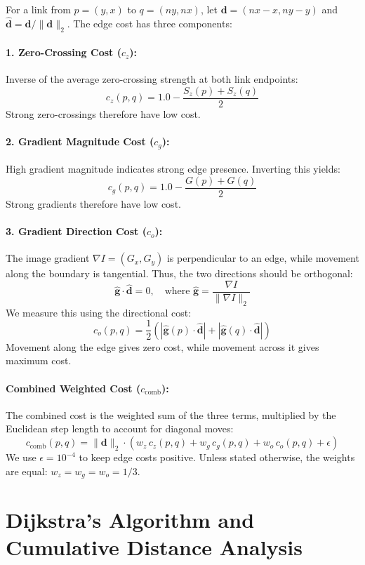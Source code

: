 \documentclass[11pt,a4paper]{article}
\begin{document}
For a link from $p=(y,x)$ to $q=(ny,nx)$, let $\mathbf d=(nx-x,ny-y)$ and $\hat{\mathbf d}=\mathbf d/\|\mathbf d\|_2$. The edge cost has three components:

\paragraph{1. Zero-Crossing Cost ($c_z$):} Inverse of the average zero-crossing strength at both link endpoints:
\[
c_z(p,q) = 1.0 - \frac{S_z(p) + S_z(q)}{2}
\]
Strong zero-crossings therefore have low cost.

\paragraph{2. Gradient Magnitude Cost ($c_g$):} High gradient magnitude indicates strong edge presence. Inverting this yields:
\[
c_g(p,q) = 1.0 - \frac{G(p) + G(q)}{2}
\]
Strong gradients therefore have low cost.

\paragraph{3. Gradient Direction Cost ($c_o$):} The image gradient $\nabla I=(G_x,G_y)$ is perpendicular to an edge, while movement along the boundary is tangential. Thus, the two directions should be orthogonal:
\[
\hat{\mathbf{g}} \cdot \hat{\mathbf{d}} = 0, \quad \text{where } \hat{\mathbf{g}} = \frac{\nabla I}{\|\nabla I\|_2}
\]
We measure this using the directional cost:
\[
c_o(p,q) = \frac{1}{2} \left( \left|\hat{\mathbf{g}}(p) \cdot \hat{\mathbf{d}}\right| + \left|\hat{\mathbf{g}}(q) \cdot \hat{\mathbf{d}}\right| \right)
\]
Movement along the edge gives zero cost, while movement across it gives maximum cost.

\paragraph{Combined Weighted Cost ($c_{\text{comb}}$):}
The combined cost is the weighted sum of the three terms, multiplied by the Euclidean step length to account for diagonal moves:
\[
c_{\text{comb}}(p,q) = \|\mathbf{d}\|_2 \cdot \left( w_z\,c_z(p,q) + w_g\,c_g(p,q) + w_o\,c_o(p,q) + \epsilon \right)
\]
We use $\epsilon=10^{-4}$ to keep edge costs positive. Unless stated otherwise, the weights are equal: $w_z=w_g=w_o=1/3$.


\section{Dijkstra's Algorithm and Cumulative Distance Analysis}
\end{document}
